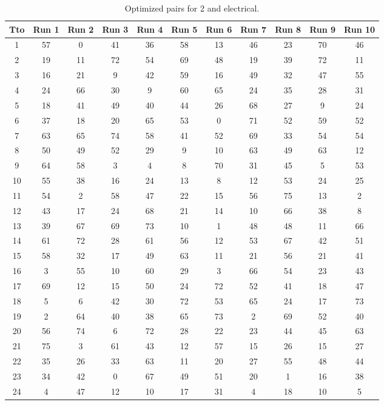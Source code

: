 \begin{table}
  \centering
  \scriptsize
  \caption{Optimized pairs for 2 and electrical.}
  \label{tab_pairs}
\begin{tabular}{c c c c c c c c c c c }
\hline
Tto & Run 1 & Run 2 & Run 3 & Run 4 & Run 5 & Run 6 & Run 7 & Run 8 & Run 9 & Run 10 \\
\hline
1 & 57 & 0 & 41 & 36 & 58 & 13 & 46 & 23 & 70 & 46 \\
2 & 19 & 11 & 72 & 54 & 69 & 48 & 19 & 39 & 72 & 11 \\
3 & 16 & 21 & 9 & 42 & 59 & 16 & 49 & 32 & 47 & 55 \\
4 & 24 & 66 & 30 & 9 & 60 & 65 & 24 & 35 & 28 & 31 \\
5 & 18 & 41 & 49 & 40 & 44 & 26 & 68 & 27 & 9 & 24 \\
6 & 37 & 18 & 20 & 65 & 53 & 0 & 71 & 52 & 59 & 52 \\
7 & 63 & 65 & 74 & 58 & 41 & 52 & 69 & 33 & 54 & 54 \\
8 & 50 & 49 & 52 & 29 & 9 & 10 & 63 & 49 & 63 & 12 \\
9 & 64 & 58 & 3 & 4 & 8 & 70 & 31 & 45 & 5 & 53 \\
10 & 55 & 38 & 16 & 24 & 13 & 8 & 12 & 53 & 24 & 25 \\
11 & 54 & 2 & 58 & 47 & 22 & 15 & 56 & 75 & 13 & 2 \\
12 & 43 & 17 & 24 & 68 & 21 & 14 & 10 & 66 & 38 & 8 \\
13 & 39 & 67 & 69 & 73 & 10 & 1 & 48 & 48 & 11 & 66 \\
14 & 61 & 72 & 28 & 61 & 56 & 12 & 53 & 67 & 42 & 51 \\
15 & 58 & 32 & 17 & 49 & 63 & 11 & 21 & 56 & 21 & 41 \\
16 & 3 & 55 & 10 & 60 & 29 & 3 & 66 & 54 & 23 & 43 \\
17 & 69 & 12 & 15 & 50 & 24 & 72 & 52 & 41 & 18 & 47 \\
18 & 5 & 6 & 42 & 30 & 72 & 53 & 65 & 24 & 17 & 73 \\
19 & 2 & 64 & 40 & 38 & 65 & 73 & 2 & 69 & 52 & 40 \\
20 & 56 & 74 & 6 & 72 & 28 & 22 & 23 & 44 & 45 & 63 \\
21 & 75 & 3 & 61 & 43 & 12 & 57 & 15 & 26 & 15 & 27 \\
22 & 35 & 26 & 33 & 63 & 11 & 20 & 27 & 55 & 48 & 44 \\
23 & 34 & 42 & 0 & 67 & 49 & 51 & 20 & 1 & 16 & 38 \\
24 & 4 & 47 & 12 & 10 & 17 & 31 & 4 & 18 & 10 & 5 \\

\end{tabular}
\end{table}
